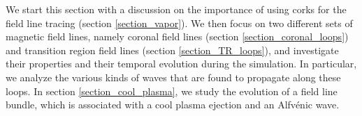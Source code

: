 \documentclass{aa}
\begin{document}
We start this section with a discussion on the importance of using corks for the field line tracing (section \ref{section_vapor}).
We then focus on two different sets of magnetic field lines, namely coronal field lines (section \ref{section_coronal_loops}) and transition region field lines (section \ref{section_TR_loops}), and investigate their properties and their temporal evolution during the simulation. In particular, we analyze the various kinds of waves that are found to propagate along these loops. 
In section \ref{section_cool_plasma}, we study the evolution of a field line bundle, which is associated with a cool plasma ejection {\color{blue} and an Alfv{\'e}nic wave}.


\end{document}
